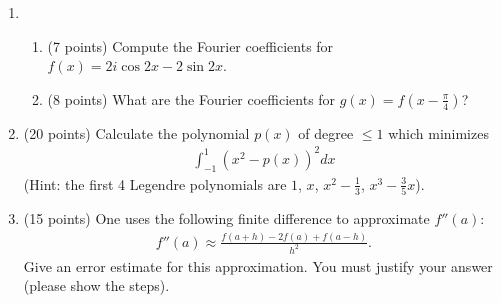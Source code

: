 \documentclass[12pt]{article}
\begin{document}
\begin{enumerate}
    \item
        \begin{enumerate}
            \item
                (7 points) Compute the Fourier coefficients for $f(x) = 2i\cos 2x - 2\sin 2x$.
            \item
                (8 points) What are the Fourier coefficients for $g(x) = f(x - \frac{\pi}{4})$?
        \end{enumerate}
    \item
        (20 points) Calculate the polynomial $p(x)$ of degree $\leq 1$ which minimizes
        \begin{align*}
            \int_{-1}^1 (x^2 - p(x))^2 dx
        \end{align*}
        (Hint: the first 4 Legendre polynomials are $1$, $x$, $x^2 - \frac{1}{3}$, $x^3 - \frac{3}{5}x$).
    \item
        (15 points) One uses the following finite difference to approximate $f''(a)$:
        \begin{align*}
            f''(a) \approx \frac{f(a + h) - 2f(a) + f(a - h)}{h^2}.
        \end{align*}
        Give an error estimate for this approximation. You must justify your answer (please show the steps).
\end{enumerate}
\end{document}
